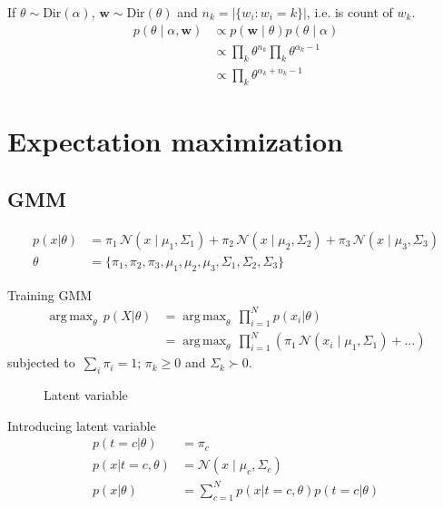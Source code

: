 \documentclass{book}
\DeclareMathOperator*{\argmax}{arg\,max}
\begin{document}
If $\theta \sim \text{Dir}(\alpha)$, $\mathbf{w} \sim \text{Dir}(\theta)$ and $n_k = \lvert{\{w_i: w_i =k \}}\rvert$, i.e. is count of $w_k$. 
\begin{align*}
p(\theta \mid \alpha, \mathbf{w}) &\propto p(\mathbf{w} \mid \theta) p(\theta \mid \alpha) \\
&\propto \prod_{k} {\theta}^{n_k} \prod_{k} {\theta}^{\alpha_k -1} \\
&\propto \prod_{k} {\theta}^{\alpha_k + n_k -1}
\end{align*}

\section{Expectation maximization}

\subsection{GMM}
\begin{align*}
p(x | \theta) &= \pi_1 \, \mathcal{N}(x\mid \mu_1 ,\Sigma_1) + \pi_2 \, \mathcal{N}(x\mid \mu_2 ,\Sigma_2) + \pi_3 \, \mathcal{N}(x\mid \mu_3 ,\Sigma_3) \\
\theta &= \{ \pi_1, \pi_2, \pi_3, \mu_1, \mu_2, \mu_3, \Sigma_1, \Sigma_2, \Sigma_3 \}
\end{align*}

Training GMM
\begin{align*}
\argmax_{\theta} \, p(X | \theta) &= \argmax_{\theta} \, \prod_{i=1}^{N}  p(x_i | \theta) \\
&= \argmax_{\theta} \, \prod_{i=1}^{N} ( \pi_1 \, \mathcal{N}(x_i\mid \mu_1 ,\Sigma_1) + \dots )
\end{align*}
subjected to $\, \sum_i \pi_i = 1; \, \pi_k \geq 0$ and $\Sigma_k \succ 0$.

\begin{figure}[h]
\centering
\caption{Latent variable}
\end{figure}

Introducing latent variable
\begin{align*}
p(t=c | \theta) &= \pi_c \\
p(x | t=c, \theta) &= \mathcal{N}(x\mid \mu_c ,\Sigma_c) \\
p(x | \theta) &= \sum_{c=1}^{N} p(x | t=c, \theta)p(t=c | \theta) 
\end{align*}
\end{document}

